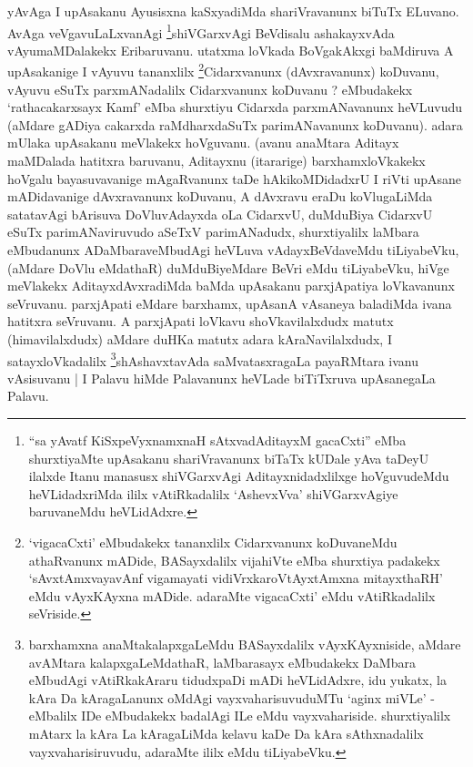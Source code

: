 \begin{artha}
yAvAga I upAsakanu Ayusisxna kaSxyadiMda shariVravanunx biTuTx ELuvano. AvAga veVgavuLaLxvanAgi \footnote{``sa yAvatf KiSxpeVyxnamxnaH sAtxvadAditayxM gacaCxti'' eMba shurxtiyaMte upAsakanu shariVravanunx biTaTx kUDale yAva taDeyU ilalxde Itanu manasusx shiVGarxvAgi Aditayxnidadxlilxge hoVguvudeMdu heVLidadxriMda ililx vAtiRkadalilx `AshevxVva' shiVGarxvAgiye baruvaneMdu heVLidAdxre.}shiVGarxvAgi BeVdisalu ashakayxvAda vAyumaMDalakekx Eribaruvanu. utatxma loVkada BoVgakAkxgi baMdiruva A upAsakanige I vAyuvu tananxlilx \footnote{`vigacaCxti' eMbudakekx tananxlilx Cidarxvanunx koDuvaneMdu athaRvanunx mADide, BASayxdalilx vija{\null}hiVte eMba shurxtiya padakekx `sAvxtAmxvayavAnf vigamayati vidiVrxkaroVtAyxtAmxna mitayxthaRH' eMdu vAyxKAyxna mADide. adaraMte vigacaCxti' eMdu vAtiRkadalilx seVriside.}Cidarxvanunx (dAvxravanunx) koDuvanu, vAyuvu eSuTx parxmANadalilx Cidarxvanunx koDuvanu ? eMbudakekx `rathacakarxsayx Kamf' eMba shurxtiyu Cidarxda parxmANavanunx heVLuvudu (aMdare gADiya cakarxda raMdharxdaSuTx parimANavanunx koDuvanu). adara mUlaka upAsakanu meVlakekx hoVguvanu. (avanu anaMtara Aditayx maMDalada hatitxra baruvanu, Aditayxnu (itararige) barxhamxloVkakekx hoVgalu bayasuvavanige mAgaRvanunx taDe hAkikoMDidadxrU I riVti upAsane mADidavanige dAvxravanunx koDuvanu, A dAvxravu eraDu koVlugaLiMda satatavAgi bArisuva DoVluvAdayxda oLa CidarxvU, duMduBiya CidarxvU eSuTx parimANaviruvudo aSeTxV parimANadudx, shurxtiyalilx laMbara eMbudanunx ADaMbaraveMbudAgi heVLuva vAdayxBeVdaveMdu tiLiyabeVku, (aMdare DoVlu eMdathaR) duMduBiyeMdare BeVri eMdu tiLiyabeVku, hiVge meVlakekx AditayxdAvxradiMda baMda upAsakanu parxjApatiya loVkavanunx seVruvanu. parxjApati eMdare barxhamx, upAsanA vAsaneya baladiMda ivana hatitxra seVruvanu. A parxjApati loVkavu shoVkavilalxdudx matutx (himavilalxdudx) aMdare duHKa matutx adara kAraNavilalxdudx, I satayxloVkadalilx \footnote{barxhamxna anaMtakalapxgaLeMdu BASayxdalilx vAyxKAyxniside, aMdare avAMtara kalapxgaLeMdathaR, laMbarasayx eMbudakekx DaMbara eMbudAgi vAtiRkakAraru tidudxpaDi mADi heVLidAdxre, idu yukatx, la kAra Da kAragaLanunx oMdAgi vayxvaharisuvuduMTu `aginx miVLe' - eMbalilx IDe eMbudakekx badalAgi ILe eMdu vayxvahariside. shurxtiyalilx mAtarx la kAra La kAragaLiMda kelavu kaDe Da kAra sAthxnadalilx vayxvaharisiruvudu, adaraMte ililx eMdu tiLiyabeVku.}shAshavxtavAda saMvatasxragaLa payaRMtara ivanu vAsisuvanu | I Palavu hiMde Palavanunx heVLade biTiTxruva upAsanegaLa Palavu.
\end{artha}

